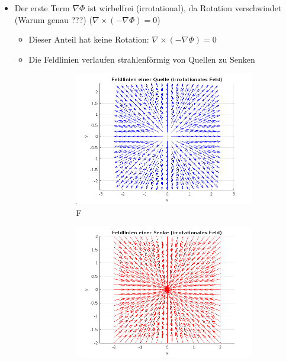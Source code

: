 \begin{itemize}
\item Der erste Term $ \nabla \Phi $ ist wirbelfrei (irrotational), da Rotation verschwindet (Warum genau ???) ($\nabla \times (-\nabla \Phi) = 0$) 
\begin{itemize}
\item Dieser Anteil hat keine Rotation: $\nabla \times (-\nabla \Phi) = 0$
\item Die Feldlinien verlaufen strahlenförmig von Quellen zu Senken
\begin{figure}[htbp]
    \centering
    \begin{subfigure}{}
        \centering
        \includegraphics[scale=0.3]{papers/helmholtz/images/Quelle.png}
        \caption{F}
        \label{fig:quelle}
    \end{subfigure}
    \hfill
    \begin{subfigure}{}
        \centering
        \includegraphics[scale=0.3]{papers/helmholtz/images/Senke.png} 

\end{subfigure}
\end{figure}
\end{itemize}
\end{itemize}
